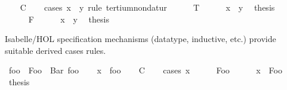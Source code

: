 \begin{isabellebody}
\ \ \isamarkupfalse%
\ C\isanewline
\ \ \isamarkupfalse%
\ {}cases\ {}x\ {}\ y{}\ rule{}\ tertium{}non{}datur{}\isanewline
\ \ \ \ \isamarkupfalse%
\ T\isanewline
\ \ \ \ \isamarkupfalse%
\ {}x\ {}\ y{}\ \isamarkupfalse%
\ {}thesis\ \isamarkupfalse%
\isanewline
\ \ \isamarkupfalse%
\isanewline
\ \ \ \ \isamarkupfalse%
\ F\isanewline
\ \ \ \ \isamarkupfalse%
\ {}x\ {}\ y{}\ \isamarkupfalse%
\ {}thesis\ \isamarkupfalse%
\isanewline
\ \ \isamarkupfalse%
%
\endisatagproof
{\isafoldproof}%
%
\isadelimproof
\isanewline
%
\endisadelimproof
{}\isamarkupfalse%
%
\isamarkuptrue%
%
\begin{isamarkuptext}%
Isabelle/HOL specification mechanisms (datatype, inductive, etc.)
  provide suitable derived cases rules.%
\end{isamarkuptext}%
\isamarkuptrue%
\isamarkupfalse%
\ foo\ {}\ Foo\ {}\ Bar\ foo\isanewline
\isanewline
{}\isamarkupfalse%
\isanewline
{}\isanewline
%
\isadelimproof
\ \ %
\endisadelimproof
%
\isatagproof
{}\isamarkupfalse%
\ x\ {}{}\ foo\isanewline
\ \ \isamarkupfalse%
\ C\isanewline
\ \ \isamarkupfalse%
\ {}cases\ x{}\isanewline
\ \ \ \ \isamarkupfalse%
\ Foo\isanewline
\ \ \ \ \isamarkupfalse%
\ {}x\ {}\ Foo{}\ \isamarkupfalse%
\ {}thesis\ \isamarkupfalse%
\isanewline
\ \ \isamarkupfalse%

\end{isabellebody}
